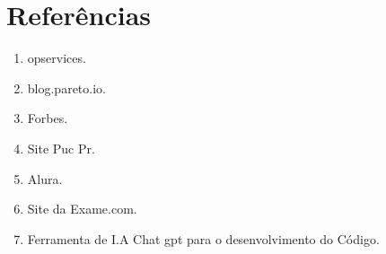 \documentclass[12pt]{article}
\begin{document}
    \section{Referências}
    
     \begin{enumerate}
        \item opservices.
        \item blog.pareto.io.
        \item Forbes.
        \item Site Puc Pr.
        \item Alura.
        \item Site da Exame.com.
        \item Ferramenta de I.A Chat gpt para o desenvolvimento do Código.
     \end{enumerate}

        
\end{document}

